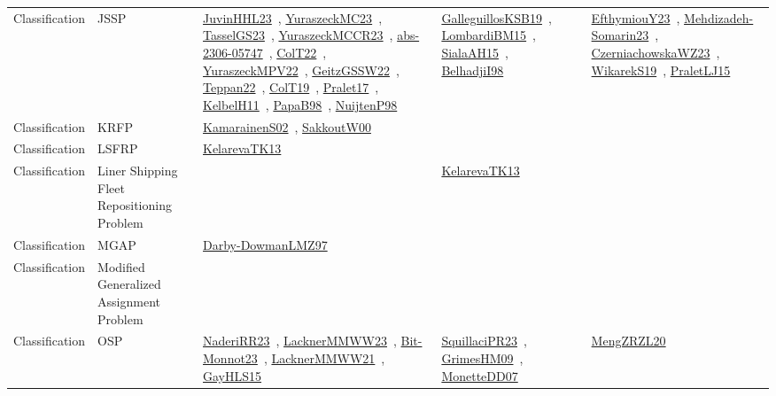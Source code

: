 {\begin{longtable}{lp{3cm}>{\raggedright\arraybackslash}p{6cm}>{\raggedright\arraybackslash}p{6cm}>{\raggedright\arraybackslash}p{8cm}}
Classification & JSSP & \href{papers/JuvinHHL23.pdf}{JuvinHHL23}~\cite{JuvinHHL23}, \href{papers/YuraszeckMC23.pdf}{YuraszeckMC23}~\cite{YuraszeckMC23}, \href{papers/TasselGS23.pdf}{TasselGS23}~\cite{TasselGS23}, \href{articles/YuraszeckMCCR23.pdf}{YuraszeckMCCR23}~\cite{YuraszeckMCCR23}, \href{articles/abs-2306-05747.pdf}{abs-2306-05747}~\cite{abs-2306-05747}, \href{articles/ColT22.pdf}{ColT22}~\cite{ColT22}, \href{articles/YuraszeckMPV22.pdf}{YuraszeckMPV22}~\cite{YuraszeckMPV22}, \href{papers/GeitzGSSW22.pdf}{GeitzGSSW22}~\cite{GeitzGSSW22}, \href{papers/Teppan22.pdf}{Teppan22}~\cite{Teppan22}, \href{papers/ColT19.pdf}{ColT19}~\cite{ColT19}, \href{papers/Pralet17.pdf}{Pralet17}~\cite{Pralet17}, \href{articles/KelbelH11.pdf}{KelbelH11}~\cite{KelbelH11}, \href{articles/PapaB98.pdf}{PapaB98}~\cite{PapaB98}, \href{articles/NuijtenP98.pdf}{NuijtenP98}~\cite{NuijtenP98} & \href{papers/GalleguillosKSB19.pdf}{GalleguillosKSB19}~\cite{GalleguillosKSB19}, \href{papers/LombardiBM15.pdf}{LombardiBM15}~\cite{LombardiBM15}, \href{papers/SialaAH15.pdf}{SialaAH15}~\cite{SialaAH15}, \href{articles/BelhadjiI98.pdf}{BelhadjiI98}~\cite{BelhadjiI98} & \href{papers/EfthymiouY23.pdf}{EfthymiouY23}~\cite{EfthymiouY23}, \href{papers/Mehdizadeh-Somarin23.pdf}{Mehdizadeh-Somarin23}~\cite{Mehdizadeh-Somarin23}, \href{articles/CzerniachowskaWZ23.pdf}{CzerniachowskaWZ23}~\cite{CzerniachowskaWZ23}, \href{articles/WikarekS19.pdf}{WikarekS19}~\cite{WikarekS19}, \href{papers/PraletLJ15.pdf}{PraletLJ15}~\cite{PraletLJ15}\\
Classification & KRFP & \href{papers/KamarainenS02.pdf}{KamarainenS02}~\cite{KamarainenS02}, \href{articles/SakkoutW00.pdf}{SakkoutW00}~\cite{SakkoutW00} &  & \\
Classification & LSFRP & \href{papers/KelarevaTK13.pdf}{KelarevaTK13}~\cite{KelarevaTK13} &  & \\
Classification & Liner Shipping Fleet Repositioning Problem &  & \href{papers/KelarevaTK13.pdf}{KelarevaTK13}~\cite{KelarevaTK13} & \\
Classification & MGAP & \href{articles/Darby-DowmanLMZ97.pdf}{Darby-DowmanLMZ97}~\cite{Darby-DowmanLMZ97} &  & \\
Classification & Modified Generalized Assignment Problem &  &  & \\
Classification & OSP & \href{articles/NaderiRR23.pdf}{NaderiRR23}~\cite{NaderiRR23}, \href{articles/LacknerMMWW23.pdf}{LacknerMMWW23}~\cite{LacknerMMWW23}, \href{papers/Bit-Monnot23.pdf}{Bit-Monnot23}~\cite{Bit-Monnot23}, \href{papers/LacknerMMWW21.pdf}{LacknerMMWW21}~\cite{LacknerMMWW21}, \href{papers/GayHLS15.pdf}{GayHLS15}~\cite{GayHLS15} & \href{papers/SquillaciPR23.pdf}{SquillaciPR23}~\cite{SquillaciPR23}, \href{papers/GrimesHM09.pdf}{GrimesHM09}~\cite{GrimesHM09}, \href{papers/MonetteDD07.pdf}{MonetteDD07}~\cite{MonetteDD07} & \href{articles/MengZRZL20.pdf}{MengZRZL20}~\cite{MengZRZL20}\\

\end{longtable}}
